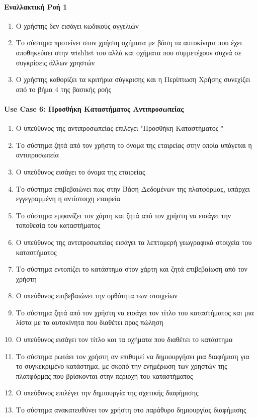 \documentclass{../ol-softwaremanual}
\begin{document}
	\paragraph{Εναλλακτική Ροή 1}
	
	\begin{enumerate}
		\item Ο χρήστης δεν εισάγει κωδικούς αγγελιών
		\item Το σύστημα προτείνει στον χρήστη οχήματα με βάση τα αυτοκίνητα που έχει αποθηκεύσει στην \en wishlist \gr του αλλά και οχήματα που συμμετέχουν συχνά σε συγκρίσεις άλλων χρηστών
		\item Ο χρήστης καθορίζει τα κριτήρια σύγκρισης και η Περίπτωση Χρήσης συνεχίζει από το βήμα 4 της βασικής ροής
	\end{enumerate}
	
	\paragraph{\en Use Case 6: \gr Προσθήκη Καταστήματος Αντιπροσωπείας}
	
	\begin{enumerate}
		\item Ο υπεύθυνος της αντιπροσωπείας επιλέγει \en"\gr Προσθήκη Καταστήματος \en"\gr
		\item Το σύστημα ζητά από τον χρήστη το όνομα της εταιρείας στην οποία υπάγεται η αντιπροσωπεία
		\item Ο υπεύθυνος εισάγει το όνομα της εταιρείας
		\item Το σύστημα επιβεβαιώνει πως στην Βάση Δεδομένων της πλατφόρμας, υπάρχει εγγεγραμμένη η αντίστοιχη εταιρεία		
		\item Το σύστημα εμφανίζει τον χάρτη και ζητά από τον χρήστη να εισάγει την τοποθεσία του καταστήματος
		\item Ο υπεύθυνος της αντιπροσωπείας εισάγει τα λεπτομερή γεωγραφικά στοιχεία του καταστήματος
		\item Το σύστημα εντοπίζει το κατάστημα στον χάρτη και ζητά επιβεβαίωση από τον χρήστη
		\item Ο υπεύθυνος επιβεβαιώνει την ορθότητα των στοιχείων		
		\item Το σύστημα ζητά από τον χρήστη να εισάγει τον τίτλο του καταστήματος και μια λίστα με τα αυτοκίνητα που διαθέτει προς πώληση
		\item Ο υπεύθυνος εισάγει τον τίτλο και τα οχήματα που διαθέτει το κατάστημα
		\item Το σύστημα ρωτάει τον χρήστη αν επιθυμεί να δημιουργήσει μια διαφήμιση για το συγκεκριμένο κατάστημα, με σκοπό την ενημέρωση των χρηστών της πλατφόρμας που βρίσκονται στην περιοχή του καταστήματος
		\item Ο υπεύθυνος επιλέγει την δημιουργία της σχετικής διαφήμισης
		\item Το σύστημα ανακατευθύνει τον χρήστη στο παράθυρο δημιουργίας διαφήμισης			
	\end{enumerate}
	
\end{document}

